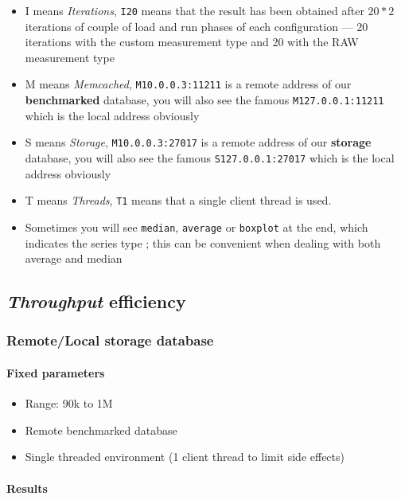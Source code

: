 \documentclass[a4paper,11pt]{report}
\begin{document}
\begin{itemize}
\item
I means \textit{Iterations}, \texttt{I20} means that the result has been obtained after $20*2$ iterations of couple of load and run phases of each configuration --- 20 iterations with the custom measurement type and 20 with the RAW measurement type
\item
M means \textit{Memcached}, \texttt{M10.0.0.3:11211} is a remote address of our \textbf{benchmarked} database, you will also see the famous \texttt{M127.0.0.1:11211} which is the local address obviously
\item
S means \textit{Storage}, \texttt{M10.0.0.3:27017} is a remote address of our \textbf{storage} database, you will also see the famous \texttt{S127.0.0.1:27017} which is the local address obviously
\item
T means \textit{Threads}, \texttt{T1} means that a single client thread is used.
\item
Sometimes you will see \texttt{median}, \texttt{average} or \texttt{boxplot} at the end, which indicates the series type ; this can be convenient when dealing with both average and median
\end{itemize}

\subsection{\textit{Throughput} efficiency}

\subsubsection{Remote/Local storage database}

\paragraph{Fixed parameters}
\begin{itemize}
\item
Range: 90k to 1M
\item
Remote benchmarked database
\item
Single threaded environment (1 client thread to limit side effects)
\end{itemize}

\paragraph{Results}
\end{document}
